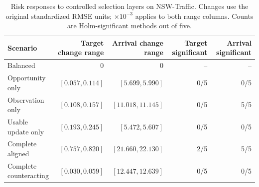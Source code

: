 \begin{table}[t]
\centering
\caption{Risk responses to controlled selection layers on NSW-Traffic.
Changes use the original standardized RMSE units; $\times10^{-3}$ applies to
both range columns. Counts are Holm-significant methods out of five.}
\label{tab:e2_layer_matrix}
\footnotesize
\begin{tabular*}{\textwidth}{@{\extracolsep{\fill}}lrrrr}
\toprule
Scenario & Target change range & Arrival change range & Target significant & Arrival significant\\
\midrule
Balanced & 0 & 0 & -- & --\\
Opportunity only & $[0.057,0.114]$ & $[5.699,5.990]$ & 0/5 & 0/5\\
Observation only & $[0.108,0.157]$ & $[11.018,11.145]$ & 0/5 & 5/5\\
Usable update only & $[0.193,0.245]$ & $[5.472,5.607]$ & 0/5 & 0/5\\
Complete aligned & $[0.757,0.820]$ & $[21.660,22.130]$ & 2/5 & 5/5\\
Complete counteracting & $[0.030,0.059]$ & $[12.447,12.639]$ & 0/5 & 0/5\\
\bottomrule
\end{tabular*}
\end{table}

